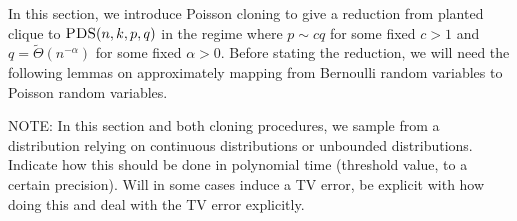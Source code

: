 \documentclass[11pt]{article}
\begin{document}


In this section, we introduce Poisson cloning to give a reduction from planted clique to $\textsc{PDS}(n, k, p, q)$ in the regime where $p \sim cq$ for some fixed $c > 1$ and $q = \tilde{\Theta}(n^{-\alpha})$ for some fixed $\alpha > 0$. Before stating the reduction, we will need the following lemmas on approximately mapping from Bernoulli random variables to Poisson random variables.

NOTE: In this section and both cloning procedures, we sample from a distribution relying on continuous distributions or unbounded distributions. Indicate how this should be done in polynomial time (threshold value, to a certain precision). Will in some cases induce a TV error, be explicit with how doing this and deal with the TV error explicitly.
\end{document}
